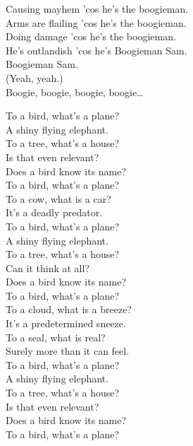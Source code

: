 Causing mayhem 'cos he's the boogieman. \\
Arms are flailing 'cos he's the boogieman. \\
Doing damage 'cos he's the boogieman. \\
He's outlandish 'cos he's Boogieman Sam. \\
Boogieman Sam. \\
(Yeah, yeah.) \\

Boogie, boogie, boogie, boogie… \\





To a bird, what's a plane? \\
A shiny flying elephant. \\
To a tree, what's a house? \\
Is that even relevant? \\
Does a bird know its name? \\
To a bird, what's a plane? \\

To a cow, what is a car? \\
It's a deadly predator. \\

To a bird, what's a plane? \\
A shiny flying elephant. \\
To a tree, what's a house? \\
Can it think at all? \\
Does a bird know its name? \\
To a bird, what's a plane? \\

To a cloud, what is a breeze? \\
It's a predetermined sneeze. \\
To a seal, what is real? \\
Surely more than it can feel. \\

To a bird, what's a plane? \\
A shiny flying elephant. \\
To a tree, what's a house? \\
Is that even relevant? \\
Does a bird know its name? \\
To a bird, what's a plane? \\


